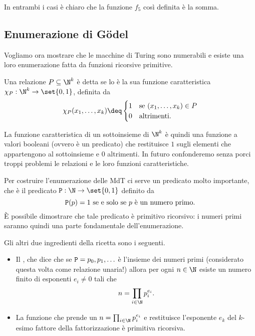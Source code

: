 In entrambi i casi è chiaro che la funzione $f_5$ così definita è la somma.

\subsection{Enumerazione di G\"odel}

Vogliamo ora mostrare che le macchine di Turing sono numerabili e esiste una loro enumerazione fatta da funzioni ricorsive primitive.

\begin{definition}
    Una relazione $P \subseteq \N^k$ è detta  se lo è la sua funzione caratteristica $\chi_P : \N^k \to \set{0, 1}$, definita da \[
        \chi_P(x_1, \dots, x_k) \deq \begin{cases}
            1 &\text{se } (x_1, \dots, x_k) \in P\\
            0 &\text{altrimenti}.
        \end{cases}
    \]
\end{definition}

La funzione caratteristica di un sottoinsieme di $\N^k$ è quindi una funzione a valori booleani (ovvero è un predicato) che restituisce $1$ sugli elementi che appartengono al sottoinsieme e $0$ altrimenti. In futuro confonderemo senza porci troppi problemi le relazioni e le loro funzioni caratteristiche.

Per costruire l'enumerazione delle MdT ci serve un predicato molto importante, che è il predicato $\monoP : \N \to \set{0, 1}$ definito da \[
    \mathtt{P}(p) = 1 \text{ se e solo se } p \text{ è un numero primo.} 
\] È possibile dimostrare che tale predicato è primitivo ricorsivo: i numeri primi saranno quindi una parte fondamentale dell'enumerazione.

Gli altri due ingredienti della ricetta sono i seguenti. \begin{itemize}
    \item Il , che dice che se $\mathtt{P} = {p_0, p_1, \dots}$ è l'insieme dei numeri primi (considerato questa volta come relazione unaria!) allora per ogni $n \in \N$ esiste un numero finito di esponenti $e_i \neq 0$ tali che \[
        n = \prod_{i \in \N} p_i^{e_i}.
    \]   
    \item La funzione che prende un $n = \prod_{i \in \N} p_i^{e_i}$ e restituisce l'esponente $e_k$ del $k$-esimo fattore della fattorizzazione è primitiva ricorsiva.  
\end{itemize}

